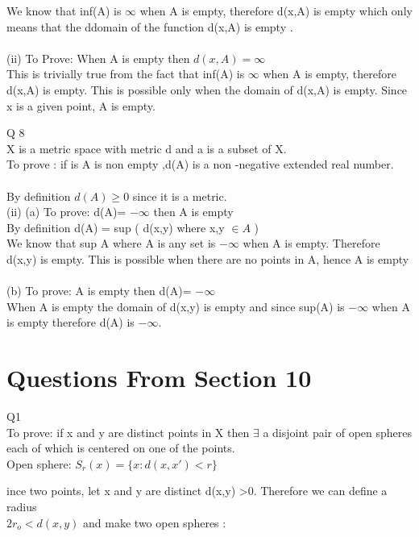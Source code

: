 \documentclass{article}
\begin{document}
We know that inf(A) is $\infty$ when A is empty, therefore d(x,A) is empty which only means that the ddomain of the function d(x,A) is empty . \\\\
(ii) To Prove: When A is empty then $d(x,A)=\infty$\\
This is trivially true from the fact that inf(A) is $\infty$ when A is empty, therefore d(x,A) is empty. This is possible only when the domain of d(x,A) is empty. Since x is a given point, A is empty.

\proof Q 8\\
X is a metric space with metric d and a is a subset of X.\\
To prove : if is A is non empty ,d(A) is a non -negative extended real number. 
\\\\
By definition $d(A) \geq 0 $ since it is a metric.\\

(ii) (a) To prove: d(A)= $-\infty$ then A is empty\\
By definition d(A) = sup ( d(x,y) where x,y $\in A$  )
\\
We know that sup A where A is any set is $-\infty$ when A is empty. Therefore d(x,y) is empty. This is possible when there are no points in A, hence A is empty\\\\
(b) To prove:  A is empty then d(A)= $-\infty$ \\
When A is empty the domain of d(x,y) is empty and since sup(A) is $-\infty$ when A is empty therefore d(A) is  $-\infty$.





\newpage

\section{Questions From Section 10}

\proof Q1\\

To prove: if x and y are distinct points in X then $\exists$ a disjoint pair of open spheres each of which is centered on one of the points.\\

Open sphere: $S_r(x) = \{x: d(x,x') < r\}$

ince two points, let x and y are distinct d(x,y) >0. Therefore we can define a radius\\
$2r_o< d(x,y)$ and make two open spheres :\\
\end{document}
